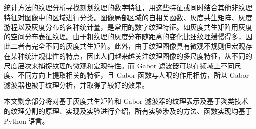统计方法的纹理分析寻找刻划纹理的数字特征，用这些特征或同时结合其他非纹理特征对图像中的区域进行分类。图像局部区域的自相关函数、灰度共生矩阵、灰度游程以及灰度分布的各种统计量，是常用的数字纹理特征。如灰度共生矩阵用灰度的空间分布表征纹理。由于粗纹理的灰度分布随距离的变化比细纹理缓慢得多，因此二者有完全不同的灰度共生矩阵。此外，由于纹理图像具有微观不规则但宏观存在某种统计规律性的特点，因此人们越来越关注纹理图像的多尺度特征，从不同的尺度层次来捕捉纹理的微观和宏观特性。而 Gabor 滤波器可以在频域上不同尺度、不同方向上提取相关的特征，且 Gabor 函数与人眼的作用相仿，所以 Gabor 滤波器也被于纹理分析，并取得了较好的效果。


本文剩余部分将对基于灰度共生矩阵和 Gabor 滤波器的纹理表示及基于聚类技术的纹理分割的原理、实现及实验进行介绍，所有实验涉及的方法、函数实现均基于 Python 语言。